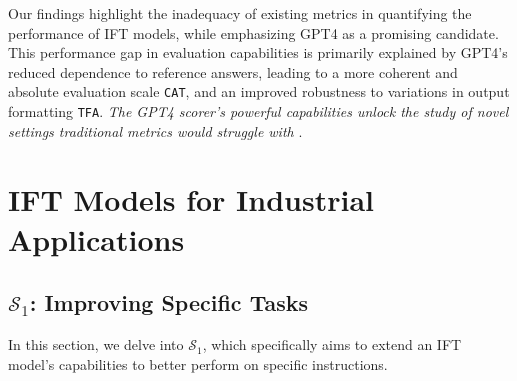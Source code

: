 

Our findings highlight the inadequacy of existing metrics in quantifying the performance of IFT models, while emphasizing GPT4 as a promising candidate. This performance gap in evaluation capabilities is primarily explained by GPT4's reduced dependence to reference answers, leading to a more coherent and absolute evaluation scale \texttt{CAT}, and an improved robustness to variations in output formatting \texttt{TFA}. \emph{The GPT4 scorer's powerful capabilities unlock the study of novel settings traditional metrics would struggle with} .


\section{IFT Models for Industrial Applications}%
% 


\subsection{$\mathcal{S}_1$: Improving Specific Tasks}\label{ssec:scenario1}
In this section, we delve into $\mathcal{S}_1$, which specifically aims to extend an IFT model's capabilities to better perform on specific instructions.


